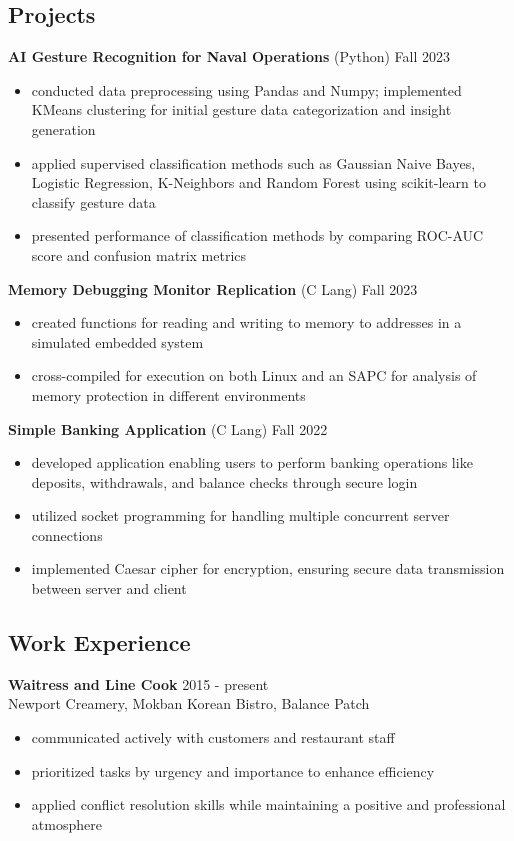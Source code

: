 \documentclass[11pt, letterpaper]{article}
\begin{document}
\subsection*{\color{accent} Projects \xdotfill[.5ex]{.4pt}}
\textbf{AI Gesture Recognition for Naval Operations}
\enspace\textbullet\enspace (Python)
\hfill Fall 2023
\begin{itemize}[itemsep=0.75pt]
\item conducted data preprocessing using Pandas and Numpy; implemented KMeans clustering for initial gesture data categorization and insight generation
\item applied supervised classification methods such as Gaussian Naive Bayes, Logistic Regression, K-Neighbors and Random Forest using scikit-learn to classify gesture data
\item presented performance of classification methods by comparing ROC-AUC score and confusion matrix metrics
\end{itemize}
\textbf{Memory Debugging Monitor Replication}
\enspace\textbullet\enspace (C Lang)
\hfill Fall 2023
\begin{itemize}[itemsep=0.75pt]
\item created functions for reading and writing to memory to addresses in a simulated embedded system
\item cross-compiled for execution on both Linux and an SAPC for analysis of memory protection in different environments
\end{itemize}
\textbf{Simple Banking Application}
\enspace\textbullet\enspace (C Lang)
\hfill Fall 2022
\begin{itemize}[itemsep=0.75pt]
\item developed application enabling users to perform banking operations like deposits, withdrawals, and balance checks through secure login
\item utilized socket programming for handling multiple concurrent server connections
\item implemented Caesar cipher for encryption, ensuring secure data transmission between server and client
\end{itemize} 

\vspace{-3mm}
\subsection*{\color{accent} Work Experience \xdotfill[.5ex]{.4pt}}
\textbf{Waitress and Line Cook} \hfill 2015 - present \\
Newport Creamery, Mokban Korean Bistro, Balance Patch
\begin{itemize}[noitemsep]
\item communicated actively with customers and restaurant staff
\item prioritized tasks by urgency and importance to enhance efficiency
\item applied conflict resolution skills while maintaining a positive and professional atmosphere
\end{itemize}
\end{document}
